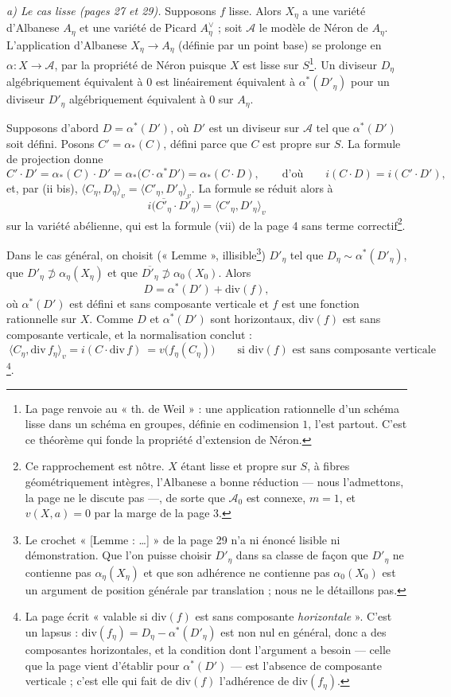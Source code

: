 \documentclass[11pt,a4paper]{article}
\begin{document}
\emph{a) Le cas lisse (pages 27 et 29).} Supposons $f$ lisse. Alors
$X_\eta$ a une variété d'Albanese $A_\eta$ et une variété de Picard
$A^\vee_\eta$ ; soit $\mathcal{A}$ le modèle de Néron de $A_\eta$.
L'application d'Albanese $X_\eta \to A_\eta$ (définie par un point base) se
prolonge en $\alpha : X \to \mathcal{A}$, par la propriété de Néron puisque
$X$ est lisse sur $S$\footnote{La page renvoie au « th. de Weil » : une
application rationnelle d'un schéma lisse dans un schéma en groupes, définie
en codimension $1$, l'est partout. C'est ce théorème qui fonde la propriété
d'extension de Néron.}. Un diviseur $D_\eta$ algébriquement équivalent à $0$
est linéairement équivalent à $\alpha^*(D'_\eta)$ pour un diviseur $D'_\eta$
algébriquement équivalent à $0$ sur $A_\eta$.

Supposons d'abord $D = \alpha^*(D')$, où $D'$ est un diviseur sur
$\mathcal{A}$ tel que $\alpha^*(D')$ soit défini. Posons
$C' = \alpha_*(C)$, défini parce que $C$ est propre sur $S$. La formule de
projection donne
\[
  C' \cdot D' = \alpha_*(C) \cdot D' = \alpha_*\bigl(C \cdot \alpha^*D'\bigr)
  = \alpha_*(C \cdot D),
  \qquad\text{d'où}\qquad i(C \cdot D) = i(C' \cdot D'),
\]
et, par (ii bis), $\langle C_\eta, D_\eta\rangle_v = \langle C'_\eta,
D'_\eta\rangle_v$. La formule se réduit alors à
\[
  \boxed{\ i\bigl(\overline{C'_\eta} \cdot \overline{D'_\eta}\bigr) =
  \langle C'_\eta, D'_\eta\rangle_v\ }
\]
sur la variété abélienne, qui est la formule (vii) de la page 4 sans terme
correctif\footnote{Ce rapprochement est nôtre. $X$ étant lisse et propre
sur $S$, à fibres géométriquement intègres, l'Albanese a bonne réduction
— nous l'admettons, la page ne le discute pas —, de sorte que
$\mathcal{A}_0$ est connexe, $m = 1$, et $v(X, a) = 0$ par la marge de la
page 3.}.

Dans le cas général, on choisit (« Lemme », illisible\footnote{Le crochet
« [Lemme : …] » de la page 29 n'a ni énoncé lisible ni démonstration. Que
l'on puisse choisir $D'_\eta$ dans sa classe de façon que $D'_\eta$ ne
contienne pas $\alpha_\eta(X_\eta)$ et que son adhérence ne contienne pas
$\alpha_0(X_0)$ est un argument de position générale par translation ;
nous ne le détaillons pas.}) $D'_\eta$ tel que $D_\eta \sim
\alpha^*(D'_\eta)$, que $D'_\eta \not\supset \alpha_\eta(X_\eta)$ et que
$\overline{D'_\eta} \not\supset \alpha_0(X_0)$. Alors
\[
  D = \alpha^*(D') + \mathrm{div}(f),
\]
où $\alpha^*(D')$ est défini et sans composante verticale et $f$ est une
fonction rationnelle sur $X$. Comme $D$ et $\alpha^*(D')$ sont horizontaux,
$\mathrm{div}(f)$ est sans composante verticale, et la normalisation
conclut :
\[
  \boxed{\ \langle C_\eta, \mathrm{div}\,f_\eta\rangle_v = i(C \cdot
  \mathrm{div}\,f)\ } = v\bigl(f_\eta(C_\eta)\bigr)
  \qquad \text{si $\mathrm{div}(f)$ est sans composante verticale}
\]
\footnote{La page écrit « valable si $\mathrm{div}(f)$ est sans composante
\emph{horizontale} ». C'est un lapsus : $\mathrm{div}(f_\eta) = D_\eta -
\alpha^*(D'_\eta)$ est non nul en général, donc a des composantes
horizontales, et la condition dont l'argument a besoin — celle que la page
vient d'établir pour $\alpha^*(D')$ — est l'absence de composante
verticale ; c'est elle qui fait de $\mathrm{div}(f)$ l'adhérence de
$\mathrm{div}(f_\eta)$.}.
\end{document}
